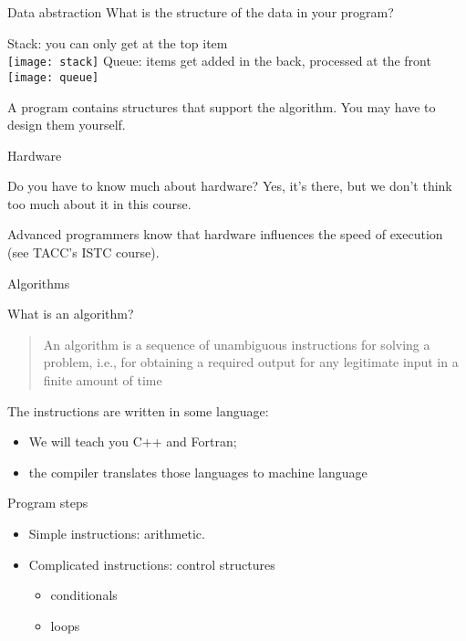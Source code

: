 \begin{block}{Data abstraction}
  \label{sl:stackabstract}
  What is the structure of the data in your program?

  \begin{multicols}{2}
    Stack: you can only get at the top item\\

    \texttt{[image: stack]}
    \vfill\columnbreak
    Queue: items get added in the back, processed at the front\\

    \texttt{[image: queue]}
  \end{multicols}
  A program contains structures that support the algorithm. You may
  have to design them yourself.
\end{block}

 {Hardware}

\begin{block}{Do you have to know much about hardware?}
  \label{sl:hardwarevid}
  Yes, it's there, but we don't think too much about it in this course.

  Advanced programmers know that hardware influences the speed of
  execution (see TACC's ISTC course).
\end{block}

 {Algorithms}

\begin{block}{What is an algorithm?}
  \label{sl:whatalgo}
  \begin{quotation}
    \raggedright\noindent
    An algorithm is a sequence of unambiguous instructions for solving
    a problem, i.e., for obtaining a required output for any
    legitimate input in a finite amount of time\\
  \end{quotation}
  The instructions are written in some language:
  \begin{itemize}
  \item We will teach you C++ and Fortran;
  \item the compiler translates those languages to machine language
  \end{itemize}
\end{block}

\begin{block}{Program steps}
  \label{sl:step-by-step}
  \begin{itemize}
  \item Simple instructions: arithmetic.
  \item Complicated instructions: control structures
    \begin{itemize}
    \item conditionals
    \item loops
    \end{itemize}
  \end{itemize}
\end{block}

